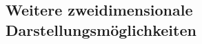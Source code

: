 \documentclass[hyperref={xetex}]{beamer}
\begin{document}
% 
% 


\subsection{Weitere zweidimensionale Darstellungsmöglichkeiten}
\end{document}
